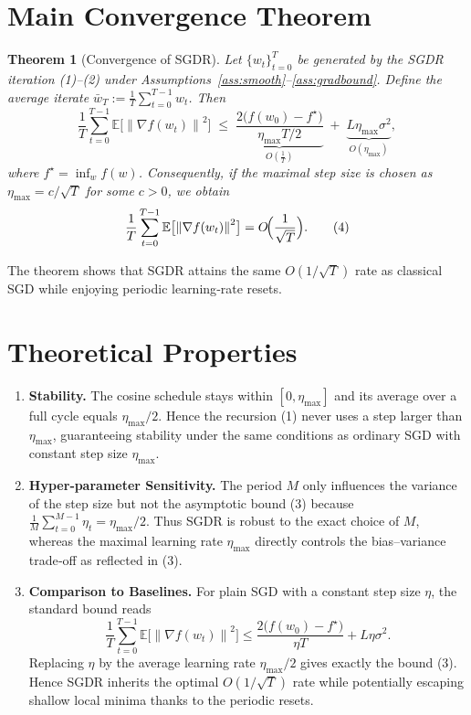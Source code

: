 \documentclass{article}
\newtheorem{theorem}{Theorem}
\newcommand{\E}{\mathbb{E}}
\newcommand{\norm}[1]{\left\lVert #1 \right\rVert}
\begin{document}
\section*{Main Convergence Theorem}
\begin{theorem}[Convergence of SGDR]\label{thm:sgdr}
Let $\{w_t\}_{t=0}^{T}$ be generated by the SGDR iteration (1)–(2) under
Assumptions~\ref{ass:smooth}–\ref{ass:gradbound}. Define the average
iterate $\bar w_T:=\frac1T\sum_{t=0}^{T-1}w_t$.
Then
\[
\frac{1}{T}\sum_{t=0}^{T-1}\E\bigl[\norm{\nabla f(w_t)}^{2}\bigr]
\;\le\;
\underbrace{\frac{2\bigl(f(w_0)-f^{\star}\bigr)}{\eta_{\max}T/2}}_{\displaystyle O\!\left(\frac{1}{T}\right)}
\;+\;
\underbrace{L\eta_{\max}\sigma^{2}}_{\displaystyle O(\eta_{\max})},
\tag{3}
\]
where $f^{\star}=\inf_{w}f(w)$. Consequently, if the maximal step size
is chosen as $\eta_{\max}=c/\sqrt{T}$ for some $c>0$, we obtain
\[
\frac{1}{T}\sum_{t=0}^{T-1}\E\bigl[\norm{\nabla f(w_t)}^{2}\bigr]
=O\!\Bigl(\frac{1}{\sqrt{T}}\Bigr).
\tag{4}
\]
\end{theorem}
The theorem shows that SGDR attains the same $O(1/\sqrt{T})$ rate as
classical SGD while enjoying periodic learning‑rate resets.

\section*{Theoretical Properties}
\begin{enumerate}[label=\arabic*)]
\item \textbf{Stability.}
The cosine schedule stays within $[0,\eta_{\max}]$ and its average over a
full cycle equals $\eta_{\max}/2$. Hence the recursion (1) never uses a step
larger than $\eta_{\max}$, guaranteeing stability under the same
conditions as ordinary SGD with constant step size $\eta_{\max}$.

\item \textbf{Hyper‑parameter Sensitivity.}
The period $M$ only influences the variance of the step size but not the
asymptotic bound (3) because $\frac1M\sum_{t=0}^{M-1}\eta_t=\eta_{\max}/2$.
Thus SGDR is robust to the exact choice of $M$, whereas the maximal
learning rate $\eta_{\max}$ directly controls the bias–variance trade‑off
as reflected in (3).

\item \textbf{Comparison to Baselines.}
For plain SGD with a constant step size $\eta$, the standard bound reads
\[
\frac{1}{T}\sum_{t=0}^{T-1}\E\!\bigl[\norm{\nabla f(w_t)}^{2}\bigr]
\le \frac{2\bigl(f(w_0)-f^{\star}\bigr)}{\eta T}+L\eta\sigma^{2}.
\]
Replacing $\eta$ by the average learning rate $\eta_{\max}/2$ gives exactly
the bound (3).  Hence SGDR inherits the optimal $O(1/\sqrt{T})$ rate while
potentially escaping shallow local minima thanks to the periodic resets.

\end{enumerate}
\end{document}
